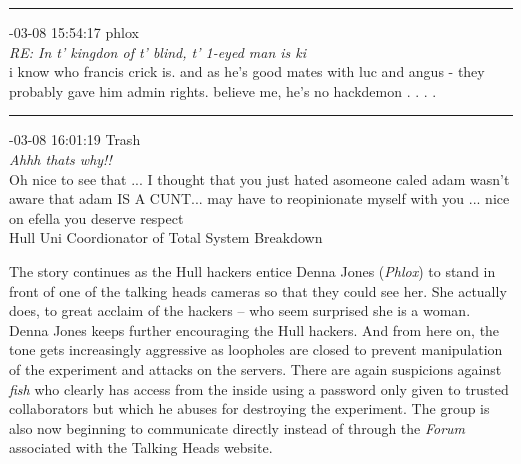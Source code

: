 \begin{mail}
\rule{0.8\textwidth}{.4pt}

{-03-08 15:54:17	phlox}\\
{\itshape RE: In t' kingdon of t' blind, t' 1-eyed man is ki}\\
i know who francis crick is. and as he's good mates with luc and angus - they probably gave him admin rights. believe me, he's no hackdemon . . . .	\\

\rule{0.8\textwidth}{.4pt}

{-03-08 16:01:19 Trash}\\
{\itshape Ahhh thats why!!}\\
Oh nice to see that ...  I thought that you just hated asomeone caled adam wasn't aware that adam IS A CUNT... 
may have to reopinionate myself with you ...  nice on efella you deserve respect \\
Hull Uni Coordionator of Total System Breakdown
%
\end{mail}

 
The story continues as the Hull hackers entice Denna Jones ({\itshape Phlox}) to stand in front of one of 
the talking heads cameras so that they could see her. She actually does, to great acclaim of the hackers -- who 
seem surprised she is a woman. Denna Jones keeps further encouraging the Hull hackers. 
And from here on, the tone gets increasingly aggressive as loopholes are closed to prevent manipulation of the experiment
and attacks on the servers. There are again suspicions against {\itshape fish} who clearly has access from the inside using 
a password only given to trusted collaborators but which he abuses for destroying the experiment. The group is also now
beginning to communicate directly instead of through the {\itshape Forum} associated with the Talking Heads website.

